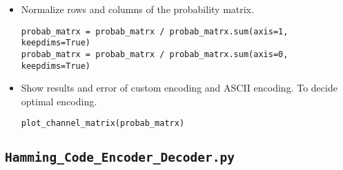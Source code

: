 \documentclass{scrartcl}
\begin{document}
\begin{itemize}
\item Normalize rows and columns of the probability matrix.
\begin{verbatim}
probab_matrx = probab_matrx / probab_matrx.sum(axis=1, keepdims=True)
probab_matrx = probab_matrx / probab_matrx.sum(axis=0, keepdims=True)
\end{verbatim}

\item Show results and error of custom encoding and ASCII encoding. To decide optimal encoding.
\begin{verbatim}
plot_channel_matrix(probab_matrx)
\end{verbatim}
\end{itemize}

\newpage

\subsection{\texttt{{Hamming\_Code\_Encoder\_Decoder.py}}}
\end{document}
